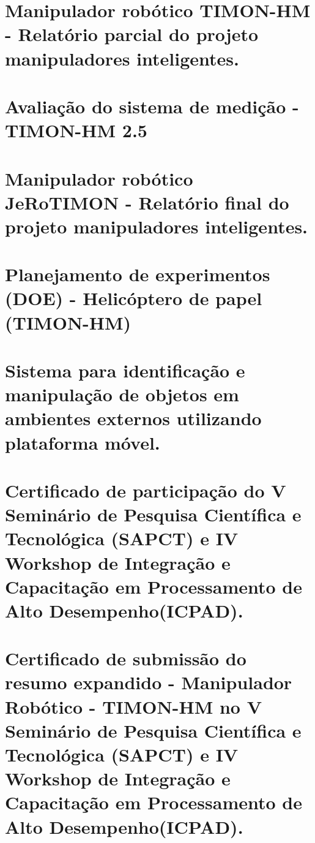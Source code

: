 \documentclass[fancyheadings, fancychapter, sureport]{Classes/a-prj}
\begin{document}
    \begin{thesisappendices}
        \chapter{Manipulador robótico TIMON-HM - Relatório parcial do projeto manipuladores inteligentes.}
        \label{appen:timon_hm_parcial}
        

        \chapter{Avaliação do sistema de medição - TIMON-HM 2.5}
        \label{appen:timon_anova}
        

        \chapter{Manipulador robótico JeRoTIMON - Relatório final do projeto manipuladores inteligentes.}
        \label{appen:jerotimon}
        

        \chapter{Planejamento de experimentos (DOE) - Helicóptero de papel (TIMON-HM)}
        \label{appen:doe_timon}
        

        \chapter{Sistema para identificação e manipulação de objetos em ambientes externos utilizando plataforma móvel.}
        \label{appen:wbm}
        

        \chapter{Certificado de participação do V Seminário de Pesquisa Científica e Tecnológica (SAPCT) e IV Workshop de Integração e Capacitação em Processamento de Alto Desempenho(ICPAD).}
        \label{appen:sapct}
        

        \chapter{Certificado de submissão do resumo expandido - Manipulador Robótico - TIMON-HM no V Seminário de Pesquisa Científica e Tecnológica (SAPCT) e IV Workshop de Integração e Capacitação em Processamento de Alto Desempenho(ICPAD).}
        \label{appen:resume_timon}
        


\end{thesisappendices}
\end{document}
